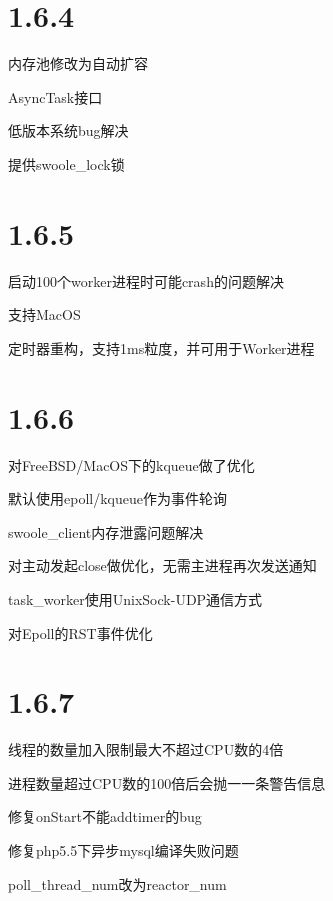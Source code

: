 \section{1.6.4}


\begin{compactitem}
\item 内存池修改为自动扩容
\item AsyncTask接口
\item 低版本系统bug解决
\item 提供swoole\_lock锁
\end{compactitem}

\section{1.6.5}


\begin{compactitem}
\item 启动100个worker进程时可能crash的问题解决
\item 支持MacOS
\item 定时器重构，支持1ms粒度，并可用于Worker进程
\end{compactitem}


\section{1.6.6}



\begin{compactitem}
\item 对FreeBSD/MacOS下的kqueue做了优化
\item 默认使用epoll/kqueue作为事件轮询
\item swoole\_client内存泄露问题解决
\item 对主动发起close做优化，无需主进程再次发送通知
\item task\_worker使用UnixSock-UDP通信方式
\item 对Epoll的RST事件优化
\end{compactitem}

\section{1.6.7}

\begin{compactitem}
\item 线程的数量加入限制最大不超过CPU数的4倍
\item 进程数量超过CPU数的100倍后会抛一一条警告信息
\item 修复onStart不能addtimer的bug
\item 修复php5.5下异步mysql编译失败问题
\item poll\_thread\_num改为reactor\_num
\end{compactitem}

